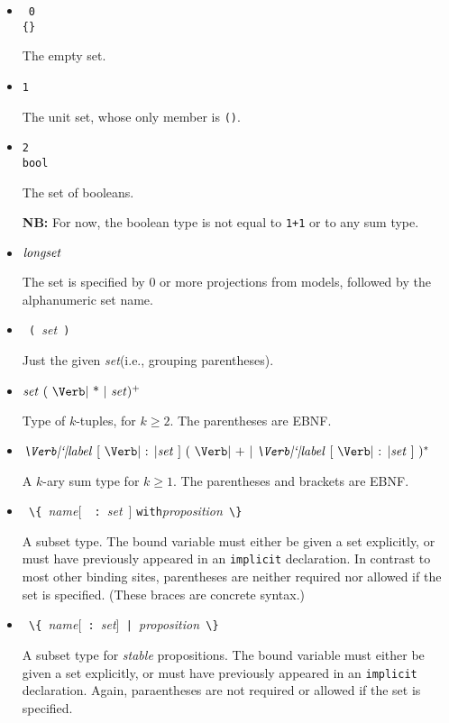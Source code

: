 \documentclass[11pt]{article}
\newcommand{\keywd}[1]{\mbox{\texttt{#1}}\xspace}
\newcommand{\IMPLICIT}{\keywd{implicit}}
\newcommand{\WITH}{\keywd{with}}
\newcommand{\metav}[1]{\mbox{\textit{#1}}\xspace}
\newcommand{\Ident}{\metav{name}}
\newcommand{\Label}{\metav{\Verb|`|label}}
\newcommand{\Setexp}{\metav{set}}
\newcommand{\Proposition}{\metav{proposition}}
\newcommand{\BAR}{\mbox{\Verb+ | +}}
\newcommand{\COLON}{\mbox{\Verb| : |}}
\newcommand{\LBRACE}{\mbox{\Verb| \{ |}}
\newcommand{\LPAREN}{\mbox{\Verb| ( |}}
\newcommand{\PLUS}{\mbox{\Verb| + |}}
\newcommand{\RBRACE}{\mbox{\Verb| \} |}}
\newcommand{\RPAREN}{\mbox{\Verb| ) |}}
\newcommand{\TIMES}{\mbox{\Verb| * |}}
\newcommand{\NB}{\textbf{NB: }}
\begin{document}
\begin{itemize}
\item \ \keywd{0}\\
      \Verb|{}|

  The empty set.

\item \keywd{1}

  The unit set, whose only member is \Verb|()|.

\item \keywd{2}\\
      \keywd{bool}

  The set of booleans.  

  \NB For now, the boolean type is not equal to 
  \Verb|1+1| or to any sum type.

\item $\metav{longset}$
  
  The set is specified by 0 or more projections from models, followed
  by the alphanumeric set name.

\item \LPAREN \Setexp \RPAREN

  Just the given \Setexp (i.e., grouping parentheses).

\item $\Setexp\ (\ \TIMES\ \Setexp )^{+}$

  Type of $k$-tuples, for $k\ge 2$.  The parentheses are EBNF.

\item $\Label\ [\ \COLON \Setexp\ ]\ (\ \PLUS\ \Label\ [\ \COLON \Setexp\ ]\ )^{*}$

  A $k$-ary sum type for $k\ge 1$.  The parentheses and brackets
  are EBNF.

\item \LBRACE \Ident [\ \COLON \Setexp\ ] \WITH \Proposition \RBRACE
      
  A subset type.  The bound variable must either be given a set
  explicitly, or must have previously appeared in an \IMPLICIT
  declaration.  In contrast to most other binding sites, parentheses
  are neither required nor allowed if the set is specified.  (These
  braces are concrete syntax.)


\item \LBRACE \Ident [\COLON \Setexp ]\BAR \Proposition \RBRACE
      
      A subset type for \emph{stable} propositions.  The bound variable must
      either be given a set explicitly, or must have previously
      appeared in an \IMPLICIT declaration.  Again, paraentheses
      are not required or allowed if the set is specified.


\end{itemize}
\end{document}
